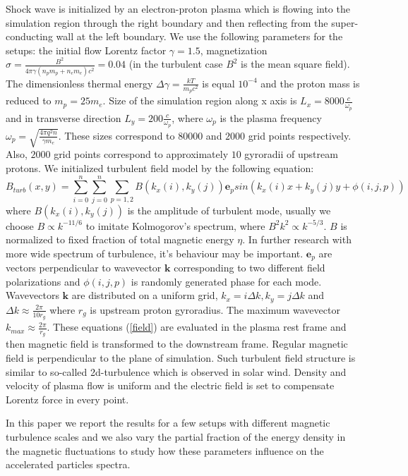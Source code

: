 \documentclass[a4paper]{jpconf}
\begin{document}
Shock wave is initialized by an electron-proton plasma which is flowing into the simulation region through the right boundary and then reflecting from 
the super-conducting wall at the left boundary. We use the following parameters for the setups: the initial flow Lorentz factor $\gamma = 1.5$, magnetization $\sigma = \frac{B^2}{4\pi\gamma (n_p m_p + n_e m_e) c^2} = 0.04$ (in the turbulent case $B^2$ is the mean square field). The dimensionless thermal energy $\Delta \gamma = \frac{k T}{m_p c^2}$ is equal $10^{-4}$ and the proton mass is reduced to $m_p = 25 m_e$. Size of the simulation region along x axis is $L_x = 8000\frac{c}{\omega_p}$ and in transverse direction $L_y = 200\frac{c}{\omega_p}$, where $\omega_p$ is the plasma frequency $\omega_p = \sqrt{\frac{4\pi q^2 n}{\gamma m_e}}$. These sizes correspond to $80000$ and $2000$ grid points respectively. Also, $2000$ grid points correspond to approximately $10$ gyroradii of upstream protons.
We initialized turbulent field model by the following equation: 
\begin{equation}\label{field}
B_{turb} (x,y) = \sum_{i=0}^{n}\sum_{j=0}^{n}\sum_{p=1,2}B(k_x(i),k_y(j)) \textbf{e}_{p} sin(k_x(i) x + k_y(j) y  + \phi (i,j,p))
\end{equation}
where $B(k_x(i),k_y(j))$ is the amplitude of turbulent mode, usually we choose $B \propto k^{-11/6}$ to imitate Kolmogorov's spectrum, where $B^2 k^2 \propto k^{-5/3}$. $B$ is normalized to fixed fraction of total magnetic energy $\eta$. In further research with more wide spectrum of turbulence, it's behaviour may be important. $\textbf{e}_{p}$ are vectors perpendicular to wavevector $\textbf{k}$ corresponding to two different field polarizations and $\phi (i,j,p)$ is randomly generated phase for each mode. Wavevectors $\textbf{k}$ are distributed on a uniform grid, $k_x = i \Delta k, k_y = j \Delta k$ and $\Delta k \approx \frac{2 \pi}{10 r_g}$ where $r_g$ is upstream proton gyroradius. The maximum wavevector $k_{max} \approx \frac{2 \pi}{r_g}$. These equations (\ref{field}) are evaluated in the plasma rest frame and then magnetic field is transformed to the downstream frame. Regular magnetic field is perpendicular to the plane of simulation. Such turbulent field structure is similar to so-called 2d-turbulence which is observed in solar wind\cite{Matthaeus1990}. Density and velocity of plasma flow is uniform and the electric field is set to compensate Lorentz force in every point.

In this paper we report the results for a few setups with different magnetic turbulence scales and we also vary the partial fraction of the energy density 
in the magnetic fluctuations to study how these parameters influence on the accelerated particles spectra.
\end{document}
